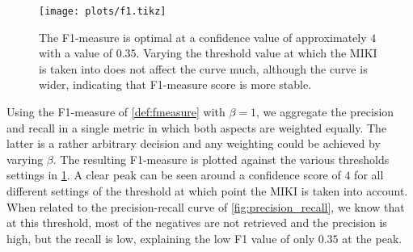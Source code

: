 \begin{figure}
    \centering
    \texttt{[image: plots/f1.tikz]}
    \caption{The F1-measure is optimal at a confidence value of approximately $4$ with a value of $0.35$. Varying the threshold value at which the MIKI is taken into does not affect the curve much, although the curve is wider, indicating that F1-measure score is more stable.}
    \label{fig:f1}
\end{figure}

Using the F1-measure of \cref{def:fmeasure} with $\beta = 1$, we aggregate the precision and recall in a single metric in which both aspects are weighted equally.
The latter is a rather arbitrary decision and any weighting could be achieved by varying $\beta$.
The resulting F1-measure is plotted against the various thresholds settings in \cref{fig:f1}.
A clear peak can be seen around a confidence score of $4$ for all different settings of the threshold at which point the MIKI is taken into account.
When related to the precision-recall curve of \cref{fig:precision_recall}, we know that at this threshold, most of the negatives are not retrieved and the precision is high, but the recall is low, explaining the low F1 value of only $0.35$ at the peak.